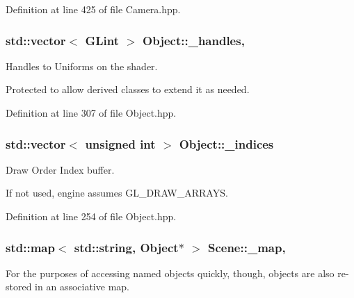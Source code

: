 Definition at line 425 of file Camera.\-hpp.

\hypertarget{class_object_a983963f564898beca4bda99676245663}{
\subsubsection[{\-\_\-handles}]{\setlength{\rightskip}{0pt plus 5cm}std\-::vector$<$ G\-Lint $>$ Object\-::\-\_\-handles\hspace{0.3cm}{\ttfamily [protected]}, {\ttfamily [inherited]}}}\label{class_object_a983963f564898beca4bda99676245663}


Handles to Uniforms on the shader. 

Protected to allow derived classes to extend it as needed. 

Definition at line 307 of file Object.\-hpp.

\hypertarget{class_object_ab85adc7a2d3b891051c096593982653d}{
\subsubsection[{\-\_\-indices}]{\setlength{\rightskip}{0pt plus 5cm}std\-::vector$<$ unsigned int $>$ Object\-::\-\_\-indices\hspace{0.3cm}{\ttfamily [inherited]}}}\label{class_object_ab85adc7a2d3b891051c096593982653d}


Draw Order Index buffer. 

If not used, engine assumes G\-L\-\_\-\-D\-R\-A\-W\-\_\-\-A\-R\-R\-A\-Y\-S. 

Definition at line 254 of file Object.\-hpp.

\hypertarget{class_scene_a8bd5d86484a12255b26b92b6cbf8d29a}{
\subsubsection[{\-\_\-map}]{\setlength{\rightskip}{0pt plus 5cm}std\-::map$<$ std\-::string, {\bf Object}$\ast$ $>$ Scene\-::\-\_\-map\hspace{0.3cm}{\ttfamily [protected]}, {\ttfamily [inherited]}}}\label{class_scene_a8bd5d86484a12255b26b92b6cbf8d29a}


For the purposes of accessing named objects quickly, though, objects are also re-\/stored in an associative map. 

